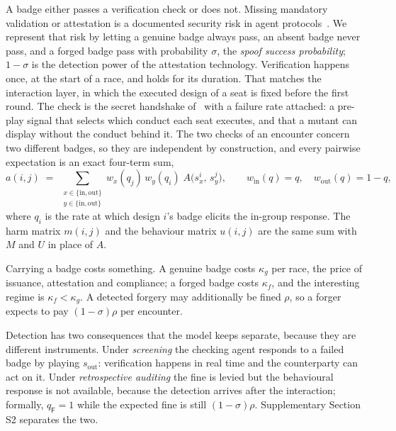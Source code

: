 \documentclass[a4paper,fleqn,longmktitle]{cas-sc}
\theoremstyle{plain}
\theoremstyle{definition}
\begin{document}
A badge either passes a verification check or does not. Missing mandatory
validation or attestation is a documented security risk in agent
protocols~\citep{anbiaee2026threatmodeling}. We represent that risk by letting a
genuine badge always pass, an absent badge never pass, and a forged badge pass
with probability $\sigma$, the \emph{spoof success probability}; $1 - \sigma$
is the detection power of the attestation technology. Verification happens once, at
the start of a race, and holds for its duration. That matches the interaction
layer, in which the executed design of a seat is fixed before the first round.
The check is the secret handshake of~\citet{robson1990efficiency} with a failure
rate attached: a pre-play signal that selects which conduct each seat executes,
and that a mutant can display without the conduct behind it.
The two checks of an encounter concern two different badges, so they are
independent by construction, and every pairwise expectation is an exact
four-term sum,
\begin{equation}
\label{eq:handshake}
a(i, j) \;=\; \sum_{\substack{x \in \{\mathrm{in}, \mathrm{out}\} \\
                              y \in \{\mathrm{in}, \mathrm{out}\}}}
  w_x(q_j)\, w_y(q_i)\; A\big(s^{i}_{x},\, s^{j}_{y}\big),
\qquad
w_{\mathrm{in}}(q) = q, \quad w_{\mathrm{out}}(q) = 1 - q,
\end{equation}
where $q_i$ is the rate at which design $i$'s badge elicits the in-group
response. The harm matrix $m(i,j)$ and the behaviour matrix $u(i,j)$ are the
same sum with $M$ and $U$ in place of $A$.

Carrying a badge costs something. A genuine badge costs $\kappa_g$ per race,
the price of issuance, attestation and compliance; a forged badge costs
$\kappa_f$, and the interesting regime is $\kappa_f < \kappa_g$. A detected
forgery may additionally be fined $\rho$, so a forger expects to pay
$(1 - \sigma)\rho$ per encounter.

Detection has two consequences that the model keeps separate, because they are
different instruments. Under \emph{screening} the checking agent responds to a
failed badge by playing $s_{\mathrm{out}}$: verification happens in real time
and the counterparty can act on it. Under \emph{retrospective auditing} the
fine is levied but the behavioural response is not available, because the
detection arrives after the interaction; formally, $q_{\mathsf{F}} = 1$ while
the expected fine is still $(1 - \sigma)\rho$. Supplementary Section S2 separates the two.
\end{document}
